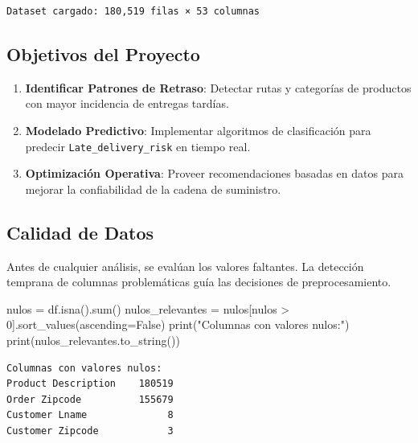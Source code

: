\documentclass[
  letterpaper,
  DIV=11,
  numbers=noendperiod]{scrartcl}
\newenvironment{Shaded}{\begin{snugshade}}{\end{snugshade}}
\newcommand{\BuiltInTok}[1]{\textcolor[rgb]{0.00,0.23,0.31}{#1}}
\newcommand{\DecValTok}[1]{\textcolor[rgb]{0.68,0.00,0.00}{#1}}
\newcommand{\NormalTok}[1]{\textcolor[rgb]{0.00,0.23,0.31}{#1}}
\newcommand{\OperatorTok}[1]{\textcolor[rgb]{0.37,0.37,0.37}{#1}}
\newcommand{\StringTok}[1]{\textcolor[rgb]{0.13,0.47,0.30}{#1}}
\newcommand{\VariableTok}[1]{\textcolor[rgb]{0.07,0.07,0.07}{#1}}
\providecommand{\tightlist}{%
  \setlength{\itemsep}{0pt}\setlength{\parskip}{0pt}}
\begin{document}
\protect{}\label{load-data}
\begin{verbatim}
Dataset cargado: 180,519 filas × 53 columnas
\end{verbatim}

\subsection{Objetivos del Proyecto}\label{objetivos-del-proyecto}

\begin{enumerate}
\def\labelenumi{\arabic{enumi}.}
\tightlist
\item
  \textbf{Identificar Patrones de Retraso}: Detectar rutas y categorías
  de productos con mayor incidencia de entregas tardías.
\item
  \textbf{Modelado Predictivo}: Implementar algoritmos de clasificación
  para predecir \texttt{Late\_delivery\_risk} en tiempo real.
\item
  \textbf{Optimización Operativa}: Proveer recomendaciones basadas en
  datos para mejorar la confiabilidad de la cadena de suministro.
\end{enumerate}

\subsection{Calidad de Datos}\label{calidad-de-datos}

Antes de cualquier análisis, se evalúan los valores faltantes. La
detección temprana de columnas problemáticas guía las decisiones de
preprocesamiento.

\protect{}\label{data-quality}
\begin{Shaded}
\begin{Highlighting}[]
\NormalTok{nulos }\OperatorTok{=}\NormalTok{ df.isna().}\BuiltInTok{sum}\NormalTok{()}
\NormalTok{nulos\_relevantes }\OperatorTok{=}\NormalTok{ nulos[nulos }\OperatorTok{\textgreater{}} \DecValTok{0}\NormalTok{].sort\_values(ascending}\OperatorTok{=}\VariableTok{False}\NormalTok{)}
\BuiltInTok{print}\NormalTok{(}\StringTok{"Columnas con valores nulos:"}\NormalTok{)}
\BuiltInTok{print}\NormalTok{(nulos\_relevantes.to\_string())}
\end{Highlighting}
\end{Shaded}

\begin{verbatim}
Columnas con valores nulos:
Product Description    180519
Order Zipcode          155679
Customer Lname              8
Customer Zipcode            3
\end{verbatim}
\end{document}
